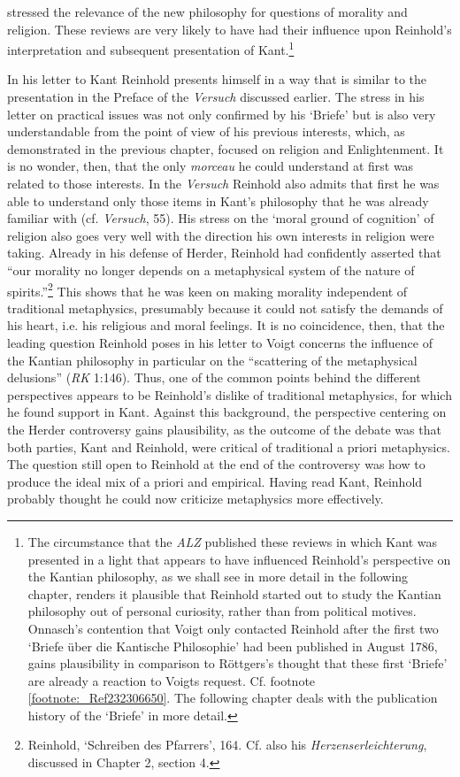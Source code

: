 stressed the relevance of the new philosophy for questions of morality and religion. These reviews are very likely to have had their influence upon Reinhold's interpretation and subsequent presentation of Kant.\footnote{ The circumstance that the \textit{ALZ} published these reviews in which Kant was presented in a light that appears to have influenced Reinhold's perspective on the Kantian philosophy, as we shall see in more detail in the following chapter, renders it plausible that Reinhold started out to study the Kantian philosophy out of personal curiosity, rather than from political motives. Onnasch's contention that Voigt only contacted Reinhold after the first two `Briefe \"{u}ber die Kantische Philosophie' had been published in August 1786, gains plausibility in comparison to R\"{o}ttgers's thought that these first `Briefe' are already a reaction to Voigts request. Cf. footnote \ref{footnote:_Ref232306650}. The following chapter deals with the publication history of the `Briefe' in more detail. } 

 In his letter to Kant Reinhold presents himself in a way that is similar to the presentation in the Preface of the \textit{Versuch} discussed earlier. The stress in his letter on practical issues was not only confirmed by his `Briefe' but is also very understandable from the point of view of his previous interests, which, as demonstrated in the previous chapter, focused on religion and Enlightenment. It is no wonder, then, that the only \textit{morceau} he could understand at first was related to those interests. In the \textit{Versuch} Reinhold also admits that first he was able to understand only those items in Kant's philosophy that he was already familiar with (cf.\textit{ Versuch}, 55). His stress on the `moral ground of cognition' of religion also goes very well with the direction his own interests in religion were taking. Already in his defense of Herder, Reinhold had confidently asserted that ``our morality no longer depends on a metaphysical system of the nature of spirits.''\footnote{ Reinhold, `Schreiben des Pfarrers', 164. Cf. also his \textit{Herzenserleichterung}, discussed in Chapter 2, section 4. } This shows that he was keen on making morality independent of traditional metaphysics, presumably because it could not satisfy the demands of his heart, i.e. his religious and moral feelings. It is no coincidence, then, that the leading question Reinhold poses in his letter to Voigt concerns the influence of the Kantian philosophy in particular on the ``scattering of the metaphysical delusions'' (\textit{RK }1:146). Thus, one of the common points behind the different perspectives appears to be Reinhold's dislike of traditional metaphysics, for which he found support in Kant. Against this background, the perspective centering on the Herder controversy gains plausibility, as the outcome of the debate was that both parties, Kant and Reinhold, were critical of traditional a priori metaphysics. The question still open to Reinhold at the end of the controversy was how to produce the ideal mix of a priori and empirical. Having read Kant, Reinhold probably thought he could now criticize metaphysics more effectively. 


